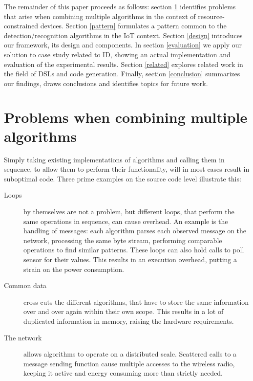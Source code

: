 \documentclass[3p,times,procedia]{elsarticle}
\begin{document}

The remainder of this paper proceeds as follows: section \ref{problems}
identifies problems that arise when combining multiple algorithms in the
context of resource-constrained devices. Section \ref{pattern} formulates a
pattern common to the detection/recognition algorithms in the IoT context.
Section \ref{design} introduces our framework, its design and components. In
section \ref{evaluation} we apply our solution to case study related to ID,
showing an actual implementation and evaluation of the experimental results.
Section \ref{related} explores related work in the field of DSLs and code
generation. Finally, section \ref{conclusion} summarizes our findings, draws
conclusions and identifies topics for future work.

\section{Problems when combining multiple algorithms}
\label{problems}

Simply taking existing implementations of algorithms and calling them in
sequence, to allow them to perform their functionality, will in most cases
result in suboptimal code. Three prime examples on the source code level
illustrate this:

\vspace{-2mm}

\begin{description}

  \item[Loops] by themselves are not a problem, but different loops, that
  perform the same operations in sequence, can cause overhead. An example is
  the handling of messages: each algorithm parses each observed message on the
  network, processing the same byte stream, performing comparable operations to
  find similar patterns. These loops can also hold calls to poll sensor for
  their values. This results in an execution overhead, putting a strain on the
  power consumption.

\vspace{-2mm}

  \item[Common data] cross-cuts the different algorithms, that have to store
  the same information over and over again within their own scope. This results
  in a lot of duplicated information in memory, raising the hardware
  requirements.

\vspace{-2mm}

  \item[The network] allows algorithms to operate on a distributed scale.
  Scattered calls to a message sending function cause multiple accesses to the
  wireless radio, keeping it active and energy consuming more than strictly
  needed.

\end{description}
\end{document}
